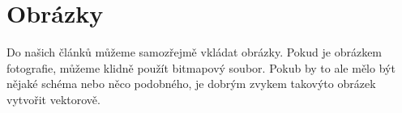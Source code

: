 \documentclass[a4paper, 11pt]{article}
\begin{document}
\section{Obrázky}
Do našich článků můžeme samozřejmě vkládat obrázky. Pokud je obrázkem fotografie, můžeme klidně použít bitmapový soubor. Pokub by to ale mělo být nějaké schéma nebo něco podobného, je dobrým zvykem takovýto obrázek vytvořit vektorově.

\begin{figure}[h]
        \centering
\end{figure}
\end{document}
